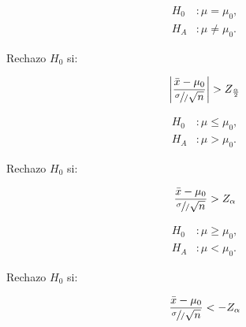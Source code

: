 \begin{minipage}[c]{\textwidth}
    \begin{minipage}[c]{0.3 \textwidth}\item
    	\begin{align*}
    	H_0&: \mu = \mu_0,\\
    	H_A&: \mu \neq \mu_0.    	
    	\end{align*}\end{minipage} \hfill
    \begin{minipage}[b]{0.3 \textwidth}\item
				Rechazo	$H_0$ si:		
		\end{minipage} \hfill
    \begin{minipage}[c]{0.3 \textwidth}\item
	 $$\left|\frac { \bar{x}-\mu_0  }{ \sfrac { \sigma  }/{ \sqrt { n }  }  }\right|> Z_{\frac{\alpha}{2}}$$
    \end{minipage}
    \end{minipage}
    
    
	\begin{minipage}[c]{\textwidth}
    \begin{minipage}[c]{0.3 \textwidth}\item
    	\begin{align*}
    	H_0&: \mu \le \mu_0,\\
    	H_A&: \mu > \mu_0.    	
    	\end{align*}\end{minipage} \hfill
    \begin{minipage}[b]{0.3 \textwidth}\item
				Rechazo $H_0$ si:		
		\end{minipage} \hfill
    \begin{minipage}[c]{0.3 \textwidth}\item
	 $$\frac { \bar{x}-\mu_0  }{ \sfrac { \sigma  }/{ \sqrt { n }  }  }> Z_{\alpha}$$
    \end{minipage}
    \end{minipage}
    
		\begin{minipage}[b]{\textwidth}
    \begin{minipage}[c]{0.3 \textwidth}\item
    	\begin{align*}
    	H_0&: \mu \ge \mu_0,\\
    	H_A&: \mu < \mu_0.    	
    	\end{align*}\end{minipage} \hfill
    \begin{minipage}[c]{0.3 \textwidth}\item
				Rechazo $H_0$ si:		
		\end{minipage} \hfill
    \begin{minipage}[c]{0.3 \textwidth}\item
	 $$\frac { \bar{x}-\mu_0  }{ \sfrac { \sigma  }/{ \sqrt { n }  }  }< -Z_{\alpha}$$
    \end{minipage}
    \end{minipage}